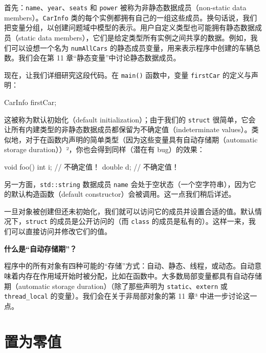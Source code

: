 首先：\texttt{name}、\texttt{year}、\texttt{seats} 和 \texttt{power} 被称为非静态数据成员（non-static data members）。\texttt{CarInfo} 类的每个实例都拥有自己的一组这些成员。换句话说，我们把变量分组，以创建问题域中模型的表示。用户自定义类型也可能拥有静态数据成员（static data members），它们是给定类型所有实例之间共享的数据。例如，我们可以设想一个名为 \texttt{numAllCars} 的静态成员变量，用来表示程序中创建的车辆总数。我们会在第 11 章“静态变量”中讨论静态数据成员。

现在，让我们详细研究这段代码。在 \texttt{main()} 函数中，变量 \texttt{firstCar} 的定义与声明：

\begin{codebox}[cpp]
CarInfo firstCar;
\end{codebox}

这被称为默认初始化（default initialization）；由于我们的 \texttt{struct} 很简单，它会让所有内建类型的非静态数据成员都保留为不确定值（indeterminate values）。类似地，对于在函数内声明的简单类型（因为这些变量具有自动存储期（automatic storage duration））²，你也会得到同样（潜在有 bug）的效果：


\begin{codebox}[cpp]
void foo() {
int i;
// 不确定值！
double d;
// 不确定值！
}
\end{codebox}

另一方面，\texttt{std::string} 数据成员 \texttt{name} 会处于空状态（一个空字符串），因为它的默认构造函数（default constructor）会被调用。这一点我们稍后详述。

一旦对象被创建但还未初始化，我们就可以访问它的成员并设置合适的值。默认情况下，\texttt{struct} 的成员是公开访问的（而 \texttt{class} 的成员是私有的）。这样一来，我们可以直接访问并修改它们的值。

\begin{myInfoBox}
\textbf{什么是“自动存储期”？}

程序中的所有对象有四种可能的“存储”方式：自动、静态、线程，或动态。自动意味着内存在作用域开始时被分配，比如在函数中。大多数局部变量都具有自动存储期（automatic storage duration）（除了那些声明为 \texttt{static}、\texttt{extern} 或 \texttt{thread\_local} 的变量）。我们会在关于非局部对象的第 11 章³ 中进一步讨论这一点。
\end{myInfoBox}

\section{置为零值}

